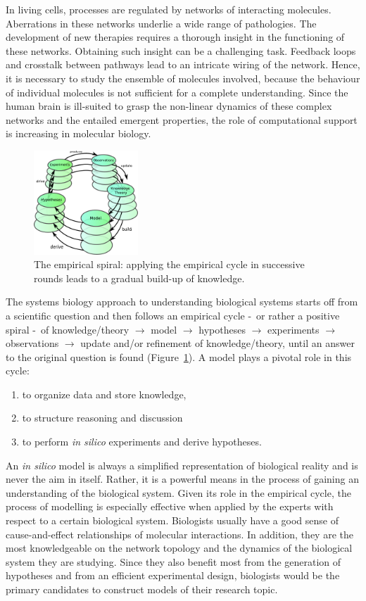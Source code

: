 In living cells, processes are regulated by networks of interacting molecules.
Aberrations in these networks underlie a wide range of pathologies. The development of new therapies
requires a thorough insight in the functioning of these networks. Obtaining such insight can be a challenging task.
Feedback loops and crosstalk between pathways lead to an intricate wiring of the network.
Hence, it is necessary to study the ensemble of molecules involved, because the 
behaviour of individual molecules is not sufficient for a complete understanding. 
Since the human brain is ill-suited to grasp the non-linear dynamics of these complex networks and
the entailed emergent properties, the role of computational support is increasing
in molecular biology.


\begin{figure}[!htb]
  \centering
  \includegraphics[width=0.35\textwidth]{images/empirical_spiral4}
 \caption{The empirical spiral: applying the empirical cycle in successive
rounds leads to a gradual build-up of knowledge.}\label{fig:empirical-spiral}
\end{figure}


The systems biology approach to understanding biological systems starts off from a
scientific question and then follows an empirical cycle \--\ or rather a positive spiral \--\ of
knowledge/theory $\rightarrow$ model $\rightarrow$ hypotheses $\rightarrow$ experiments $\rightarrow$
observations $\rightarrow$ update and/or refinement of knowledge/theory,
until an answer to the original question is found (Figure~\ref{fig:empirical-spiral}).
A model plays a pivotal role in this cycle:
\begin{enumerate}
  \item to organize data and store knowledge,
  \item to structure reasoning and discussion
  \item to perform \emph{in silico} experiments and derive hypotheses.
\end{enumerate}
An \emph{in silico} model is always a simplified representation of biological reality and is never the 
aim in itself.
Rather, it is a powerful means in the process of gaining an understanding of the biological system.
Given its role in the empirical cycle, the process of modelling is especially effective
when applied by the experts with respect to a certain biological system. Biologists usually have a good sense 
of cause-and-effect relationships of molecular interactions. In addition, they are the most knowledgeable
on the network topology and the dynamics of the biological system they are studying.
Since they also benefit most from the generation of hypotheses and from an efficient experimental design, 
biologists would be the primary candidates to construct models of their research topic.


